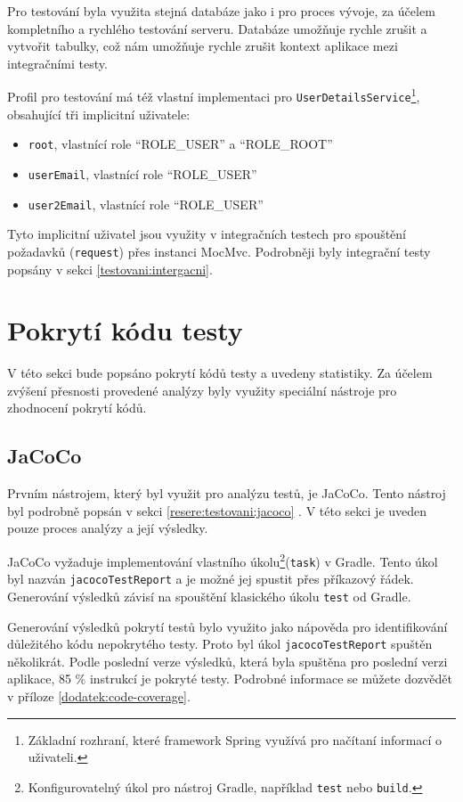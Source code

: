     Pro testování byla  využita stejná databáze jako i pro proces vývoje, za účelem kompletního a rychlého testování serveru. Databáze umožňuje rychle zrušit a vytvořit tabulky, což nám umožňuje rychle zrušit kontext aplikace mezi integračními testy.
    
    Profil pro testování má též vlastní implementaci pro \verb|UserDetailsService|\footnote{Základní rozhraní, které framework Spring využívá pro načítaní informací o uživateli.}, obsahující tři implicitní uživatele:
    \begin{itemize}
            \item \verb|root|, vlastnící role \enquote{ROLE\_USER} a \enquote{ROLE\_ROOT} 
            \item \verb|userEmail|, vlastnící role \enquote{ROLE\_USER}
            \item \verb|user2Email|, vlastnící role \enquote{ROLE\_USER}
    \end{itemize}
    Tyto implicitní uživatel jsou využity v integračních testech pro spouštění požadavků (\verb|request|) přes instanci MocMvc. Podrobněji byly integrační testy popsány v sekci \ref{testovani:intergacni}.
    
\section{Pokrytí kódu testy}\label{testovani:pokryti}
    V této sekci bude popsáno pokrytí kódů testy a uvedeny statistiky. Za účelem zvýšení přesnosti provedené analýzy byly využity speciální nástroje pro zhodnocení pokrytí kódů.
    
    \subsection{JaCoCo}
    Prvním nástrojem, který byl využit pro analýzu testů, je JaCoCo. Tento nástroj byl podrobně popsán v sekci \ref{resere:testovani:jacoco} . V této sekci je uveden pouze proces analýzy a její výsledky.
    
    JaCoCo vyžaduje implementování vlastního úkolu\footnote{Konfigurovatelný úkol pro nástroj Gradle, například \texttt{test} nebo \texttt{build}.}(\verb|task|) v Gradle. Tento úkol byl nazván \verb|jacocoTestReport| a je možné jej spustit přes příkazový řádek. Generování výsledků závisí na spouštění klasického úkolu \verb|test| od Gradle. 
    
    Generování výsledků pokrytí testů bylo využito jako nápověda pro identifikování důležitého kódu nepokrytého testy. Proto byl úkol \verb|jacocoTestReport| spuštěn několikrát. Podle poslední verze výsledků, která byla spuštěna pro poslední verzi aplikace, 85 \% instrukcí je pokryté testy. Podrobné informace se můžete dozvědět v příloze \ref{dodatek:code-coverage}.
